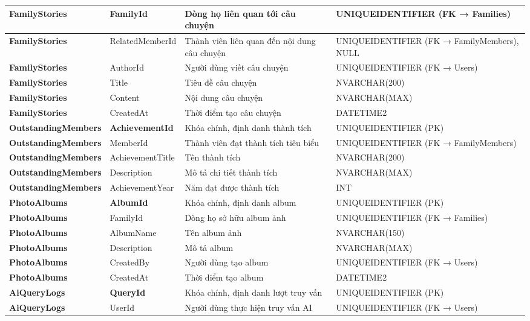 \begin{longtable}{|p{}|p{}|p{}|p{}|}
\textbf{FamilyStories} & FamilyId & Dòng họ liên quan tới câu chuyện & UNIQUEIDENTIFIER (FK → Families) \\ \hline
\textbf{FamilyStories} & RelatedMemberId & Thành viên liên quan đến nội dung câu chuyện & UNIQUEIDENTIFIER (FK → FamilyMembers), NULL \\ \hline
\textbf{FamilyStories} & AuthorId & Người dùng viết câu chuyện & UNIQUEIDENTIFIER (FK → Users) \\ \hline
\textbf{FamilyStories} & Title & Tiêu đề câu chuyện & NVARCHAR(200) \\ \hline
\textbf{FamilyStories} & Content & Nội dung câu chuyện & NVARCHAR(MAX) \\ \hline
\textbf{FamilyStories} & CreatedAt & Thời điểm tạo câu chuyện & DATETIME2 \\ \hline
\textbf{OutstandingMembers} & \textbf{AchievementId} & Khóa chính, định danh thành tích & UNIQUEIDENTIFIER (PK) \\ \hline
\textbf{OutstandingMembers} & MemberId & Thành viên đạt thành tích tiêu biểu & UNIQUEIDENTIFIER (FK → FamilyMembers) \\ \hline
\textbf{OutstandingMembers} & AchievementTitle & Tên thành tích & NVARCHAR(200) \\ \hline
\textbf{OutstandingMembers} & Description & Mô tả chi tiết thành tích & NVARCHAR(MAX) \\ \hline
\textbf{OutstandingMembers} & AchievementYear & Năm đạt được thành tích & INT \\ \hline
\textbf{PhotoAlbums} & \textbf{AlbumId} & Khóa chính, định danh album & UNIQUEIDENTIFIER (PK) \\ \hline
\textbf{PhotoAlbums} & FamilyId & Dòng họ sở hữu album ảnh & UNIQUEIDENTIFIER (FK → Families) \\ \hline
\textbf{PhotoAlbums} & AlbumName & Tên album ảnh & NVARCHAR(150) \\ \hline
\textbf{PhotoAlbums} & Description & Mô tả album & NVARCHAR(MAX) \\ \hline
\textbf{PhotoAlbums} & CreatedBy & Người dùng tạo album & UNIQUEIDENTIFIER (FK → Users) \\ \hline
\textbf{PhotoAlbums} & CreatedAt & Thời điểm tạo album & DATETIME2 \\ \hline
\textbf{AiQueryLogs} & \textbf{QueryId} & Khóa chính, định danh lượt truy vấn & UNIQUEIDENTIFIER (PK) \\ \hline
\textbf{AiQueryLogs} & UserId & Người dùng thực hiện truy vấn AI & UNIQUEIDENTIFIER (FK → Users) \\ \hline

\end{longtable}
